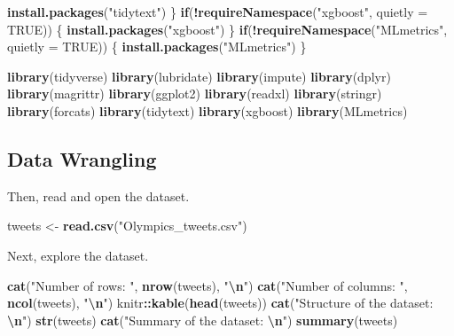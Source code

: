 \documentclass[
]{article}
\newenvironment{Shaded}{\begin{snugshade}}{\end{snugshade}}
\newcommand{\AttributeTok}[1]{\textcolor[rgb]{0.13,0.29,0.53}{#1}}
\newcommand{\ConstantTok}[1]{\textcolor[rgb]{0.56,0.35,0.01}{#1}}
\newcommand{\ControlFlowTok}[1]{\textcolor[rgb]{0.13,0.29,0.53}{\textbf{#1}}}
\newcommand{\FunctionTok}[1]{\textcolor[rgb]{0.13,0.29,0.53}{\textbf{#1}}}
\newcommand{\NormalTok}[1]{#1}
\newcommand{\OtherTok}[1]{\textcolor[rgb]{0.56,0.35,0.01}{#1}}
\newcommand{\SpecialCharTok}[1]{\textcolor[rgb]{0.81,0.36,0.00}{\textbf{#1}}}
\newcommand{\StringTok}[1]{\textcolor[rgb]{0.31,0.60,0.02}{#1}}
\begin{document}
\begin{Shaded}
\begin{Highlighting}[]
  \FunctionTok{install.packages}\NormalTok{(}\StringTok{"tidytext"}\NormalTok{)}
\NormalTok{\}}
\ControlFlowTok{if}\NormalTok{(}\SpecialCharTok{!}\FunctionTok{requireNamespace}\NormalTok{(}\StringTok{"xgboost"}\NormalTok{, }\AttributeTok{quietly =} \ConstantTok{TRUE}\NormalTok{)) \{}
  \FunctionTok{install.packages}\NormalTok{(}\StringTok{"xgboost"}\NormalTok{)}
\NormalTok{\}}
\ControlFlowTok{if}\NormalTok{(}\SpecialCharTok{!}\FunctionTok{requireNamespace}\NormalTok{(}\StringTok{"MLmetrics"}\NormalTok{, }\AttributeTok{quietly =} \ConstantTok{TRUE}\NormalTok{)) \{}
  \FunctionTok{install.packages}\NormalTok{(}\StringTok{"MLmetrics"}\NormalTok{)}
\NormalTok{\}}

\FunctionTok{library}\NormalTok{(tidyverse)}
\FunctionTok{library}\NormalTok{(lubridate)}
\FunctionTok{library}\NormalTok{(impute)}
\FunctionTok{library}\NormalTok{(dplyr)}
\FunctionTok{library}\NormalTok{(magrittr)}
\FunctionTok{library}\NormalTok{(ggplot2)}
\FunctionTok{library}\NormalTok{(readxl)}
\FunctionTok{library}\NormalTok{(stringr)}
\FunctionTok{library}\NormalTok{(forcats)}
\FunctionTok{library}\NormalTok{(tidytext)}
\FunctionTok{library}\NormalTok{(xgboost)}
\FunctionTok{library}\NormalTok{(MLmetrics)}
\end{Highlighting}
\end{Shaded}

\subsection{Data Wrangling}\label{data-wrangling}

Then, read and open the dataset.

\begin{Shaded}
\begin{Highlighting}[]
\NormalTok{tweets }\OtherTok{\textless{}{-}} \FunctionTok{read.csv}\NormalTok{(}\StringTok{"Olympics\_tweets.csv"}\NormalTok{)}
\end{Highlighting}
\end{Shaded}

Next, explore the dataset.

\begin{Shaded}
\begin{Highlighting}[]
\FunctionTok{cat}\NormalTok{(}\StringTok{"Number of rows: "}\NormalTok{, }\FunctionTok{nrow}\NormalTok{(tweets), }\StringTok{"}\SpecialCharTok{\textbackslash{}n}\StringTok{"}\NormalTok{)}
\FunctionTok{cat}\NormalTok{(}\StringTok{"Number of columns: "}\NormalTok{, }\FunctionTok{ncol}\NormalTok{(tweets), }\StringTok{"}\SpecialCharTok{\textbackslash{}n}\StringTok{"}\NormalTok{)}
\NormalTok{knitr}\SpecialCharTok{::}\FunctionTok{kable}\NormalTok{(}\FunctionTok{head}\NormalTok{(tweets))}
\FunctionTok{cat}\NormalTok{(}\StringTok{"Structure of the dataset: }\SpecialCharTok{\textbackslash{}n}\StringTok{"}\NormalTok{)}
\FunctionTok{str}\NormalTok{(tweets)}
\FunctionTok{cat}\NormalTok{(}\StringTok{"Summary of the dataset: }\SpecialCharTok{\textbackslash{}n}\StringTok{"}\NormalTok{)}
\FunctionTok{summary}\NormalTok{(tweets)}
\end{Highlighting}
\end{Shaded}
\end{document}

